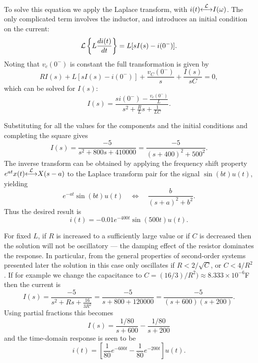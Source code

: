 \documentclass[10pt]{beamer}
\newcommand{\ltpair}{{\stackrel{\cal L}{\longleftrightarrow}}}
\begin{document}
To solve this equation we apply the Laplace transform, with $i(t) \ltpair I(\omega)$.  The only complicated term involves the inductor, and introduces an initial condition on the current:
\begin{equation*}
  {\cal L} \left\{ L \frac{di(t)}{dt} \right\} = L [s I(s) - i(0^-)].
\end{equation*}
Noting that $v_c(0^-)$ is constant the full transformation is given by
\begin{equation*}
  R I(s) + L [s I(s) - i(0^-)] + \frac{v_C(0^-)}{s} + \frac{I(s)}{sC} = 0,
\end{equation*}
which can be solved for $I(s)$:
\begin{equation*}
  I(s) = \frac{s i(0^-) - \frac{v_c(0^-)}{L}}{s^2 + \frac{R}{L}s + \frac{1}{LC}}.
\end{equation*}

Substituting for all the values for the components and the initial conditions and completing the square gives
\begin{equation*}
  I(s) = \frac{-5}{s^2 + 800 s + 410000} = \frac{-5}{(s+400)^2 + 500^2}.
\end{equation*}
The inverse transform can be obtained by applying the frequency shift property $e^{a t} x(t) \ltpair X(s-a)$ to the Laplace transform pair for the signal $\sin(b t) u(t)$, yielding
\begin{equation*}
  e^{-at} \sin(b t) u(t) \quad \Longleftrightarrow \quad \frac{b}{(s+a)^2 + b^2}.
\end{equation*}
Thus the desired result is
\begin{equation*}
  i(t) = -0.01 e^{-400t} \sin(500 t) u(t).
\end{equation*}

For fixed $L$, if $R$ is increased to a sufficiently large value or if $C$ is decreased then the solution will not be oscillatory --- the damping effect of the resistor dominates the response.  In particular, from the general properties of second-order systems presented later the solution in this case only oscillates if $R<2/\sqrt{C}$, or $C<4/R^2$.  If for example we change the capacitance to $C = (16/3)/ R^2) \approx 8.333 \times 10^{-6}$F then the current is
\begin{equation*}
  I(s) = \frac{-5}{s^2 + R s + \frac{16}{3 R^2}} = \frac{-5}{s + 800 + 120000}
  = \frac{-5}{(s + 600)(s+200)}.
\end{equation*}
Using partial fractions this becomes
\begin{equation*}
  I(s) = \frac{1/80}{s + 600} - \frac{1/80}{s + 200}
\end{equation*}
and the time-domain response is seen to be
\begin{equation*}
  i(t) = \left[ \frac{1}{80} e^{-600 t} - \frac{1}{80} e^{-200 t} \right] u(t).
\end{equation*}
\end{document}

